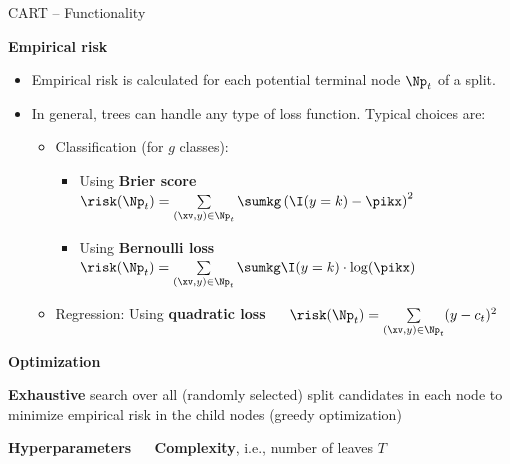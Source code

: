 \documentclass[11pt,compress,t,notes=noshow, xcolor=table]{beamer}
\newcommand{\highlight}[1]{\textcolor{highlightcol}{\textbf{#1}}}
\begin{document}
\begin{frame}{CART -- Functionality}

\footnotesize

\highlight{Empirical risk} \\

\begin{itemize}
  \item Empirical risk is calculated for each potential terminal node $\Np_t$
  of a split.
  \item In general, trees can handle any type of loss function. Typical choices
  are:
  \begin{itemize}
    \footnotesize
    \item Classification (for $g$ classes):
    \begin{itemize}
      \footnotesize
      \item Using \textbf{Brier score} ~~
      $\risk(\Np_t) = \sum\limits_{(\xv,y) \in \Np_t} \sumkg \left( \I(y = k)
      - \pikx \right)^2$
      \item Using \textbf{Bernoulli loss} ~~
      $\risk(\Np_t) = \sum\limits_{(\xv,y) \in \Np_t} \sumkg \I(y = k) \cdot
      \log(\pikx)$
    \end{itemize}
    \item Regression: Using \textbf{quadratic loss} ~~
    $\risk(\Np_t) = \sum\limits_{(\xv,y) \in \Np_t} (y - c_t)^2$
  \end{itemize}
\end{itemize}

\medskip

\highlight{Optimization}

\textbf{Exhaustive} search over all (randomly selected) split candidates in each 
node to minimize empirical risk in the child nodes (greedy optimization)

\medskip

\highlight{Hyperparameters} ~~ \textbf{Complexity}, i.e., 
number of leaves $T$ \\

\medskip


\normalsize
  
\end{frame}

\end{document}
